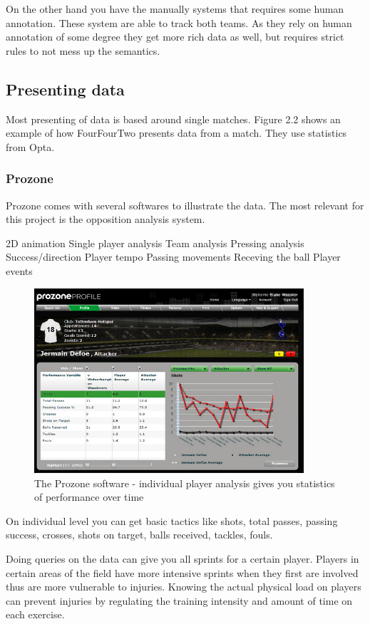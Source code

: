 On the other hand you have the manually systems that requires some human annotation. These system are able to track both teams. As they rely on human annotation of some degree they get more rich data as well, but requires strict rules to not mess up the semantics. 


\subsection{Presenting data}

Most presenting of data is based around single matches. Figure 2.2 shows an example of how FourFourTwo presents data from a match. They use statistics from Opta. 

\subsubsection{Prozone}


Prozone comes with several softwares to illustrate the data. The most relevant for this project is the opposition analysis system. 

2D animation
Single player analysis
Team analysis
Pressing analysis
Success/direction
Player tempo
Passing movements
Receving the ball
Player events

\begin{figure}[ht!]
\centering
\includegraphics[width=100mm]{images/general/prozonestats.png}
\caption{The Prozone software - individual player analysis gives you statistics of performance over time}
\label{overflow}
\end{figure}

On individual level you can get basic tactics like shots, total passes, passing success, crosses, shots on target, balls received, tackles, fouls. 

Doing queries on the data can give you all sprints for a certain player. Players in certain areas of the field have more intensive sprints when they first are involved thus are more vulnerable to injuries. Knowing the actual physical load on players can prevent injuries by regulating the training intensity and amount of time on each exercise.

